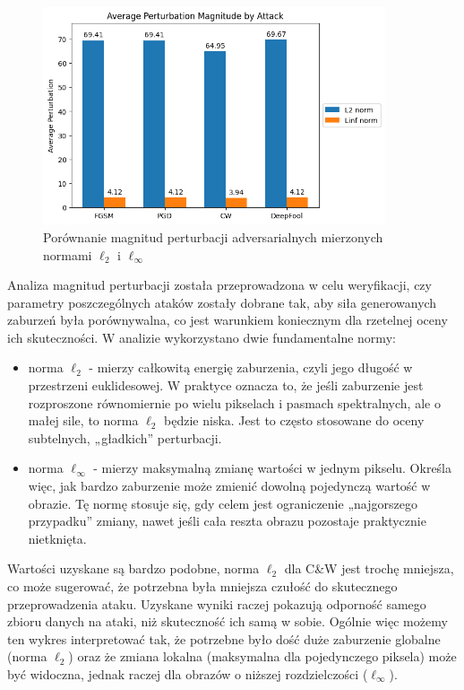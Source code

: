 \documentclass[12pt]{article}
\begin{document}
\begin{figure}[H]
    \centering
    \includegraphics[width=0.9\textwidth]{perturbations.png} 
    \caption{Porównanie magnitud perturbacji adversarialnych mierzonych normami $\ell_2$ i $\ell_\infty$}
\end{figure}

Analiza magnitud perturbacji została przeprowadzona w celu weryfikacji, czy parametry poszczególnych ataków zostały dobrane tak, aby siła generowanych zaburzeń była porównywalna, co jest warunkiem koniecznym dla rzetelnej oceny ich skuteczności. W analizie wykorzystano dwie fundamentalne normy:
\begin{itemize}
    \item norma $\ell_2$ - mierzy całkowitą energię zaburzenia, czyli jego długość w przestrzeni euklidesowej. W praktyce oznacza to, że jeśli zaburzenie jest rozproszone równomiernie po wielu pikselach i pasmach spektralnych, ale o małej sile, to norma $\ell_2$ będzie niska. Jest to często stosowane do oceny subtelnych, „gładkich” perturbacji.
    \item norma $\ell_\infty$ - mierzy maksymalną zmianę wartości w jednym pikselu. Określa więc, jak bardzo zaburzenie może zmienić dowolną pojedynczą wartość w obrazie. Tę normę stosuje się, gdy celem jest ograniczenie „najgorszego przypadku” zmiany, nawet jeśli cała reszta obrazu pozostaje praktycznie nietknięta.
\end{itemize}
Wartości uzyskane są bardzo podobne, norma $\ell_2$ dla C\&W jest trochę mniejsza, co może sugerować, że potrzebna była mniejsza czułość do skutecznego przeprowadzenia ataku. Uzyskane wyniki raczej pokazują odporność samego zbioru danych na ataki, niż skuteczność ich samą w sobie. Ogólnie więc możemy ten wykres interpretować tak, że potrzebne było dość duże zaburzenie globalne (norma $\ell_2$) oraz że zmiana lokalna (maksymalna dla pojedynczego piksela) może być widoczna, jednak raczej dla obrazów o niższej rozdzielczości ($\ell_\infty$).
\end{document}

